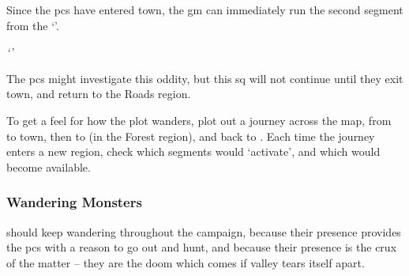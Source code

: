 \begin{multicols}{2}
{  Since the \glspl{pc} have entered \gls{town}, the \gls{gm} can immediately run the second \gls{segment} from the `'.

  \textit{`'}

  The \glspl{pc} might investigate this oddity, but this \gls{sq} will not continue until they exit \gls{town}, and return to the Roads \gls{region}.
}

To get a feel for how the plot wanders, plot out a journey across the map, from  to \gls{town}, then to  (in the Forest \gls{region}), and back to .
Each time the journey enters a new \gls{region}, check which \glspl{segment} would `activate', and which would become available.


\renewcommand\csComments{
  \mapCircle{16}{76}{1.7}{Dyson_Logos/bandit_camp}
  \mapCircle{35}{88}{2}{Dyson_Logos/forgotten_city}
  \mapCircle{27}{09}{2}{Dyson_Logos/qualme_temple}
  \mapCircle[4]{56}{52}{2.5}{Dyson_Logos/town}
  \mapCircle{44}{41}{2}{Dyson_Logos/redfall}
  \mapCircle{83}{09}{1.7}{Dyson_Logos/shadow_gate}
  \mapCircle{86}{45}{1.7}{Dyson_Logos/lochside}
  \draw[very thick,white] (11,0.6) -- (12,0.6) node[anchor=north]{\outline{10 Miles}} -- (13,0.6) ;
}



\subsubsection{Wandering Monsters}
should keep wandering throughout the \gls{campaign}, because their presence provides the \glspl{pc} with a reason to go out and hunt, and because their presence is the crux of the matter -- they are the doom which comes if \gls{valley} tears itself apart.


\end{multicols}
